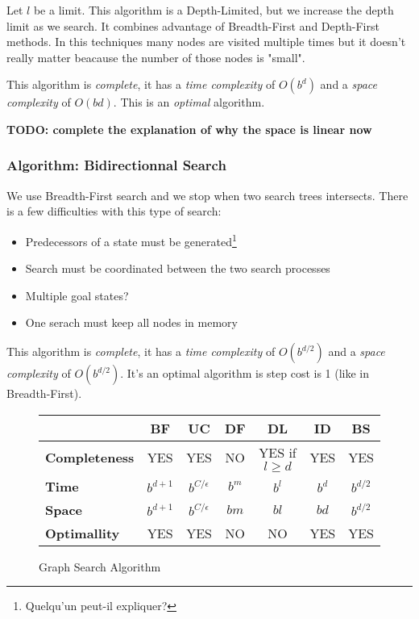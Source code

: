 Let $l$ be a limit. This algorithm is a Depth-Limited, but we increase the depth limit as we search. It combines advantage of Breadth-First and Depth-First methods. In this techniques many nodes are visited multiple times but it doesn't really matter beacause the number of those nodes is "small".

This algorithm is \textit{complete}, it has a \textit{time complexity} of $O(b^d)$ and a \textit{space complexity} of $O(bd)$. This is an \textit{optimal} algorithm.

\textbf{TODO: complete the explanation of why the space is linear now}

\subsubsection{Algorithm: Bidirectionnal Search}

We use Breadth-First search and we stop when two search trees intersects. There is a few difficulties with this type of search:
\begin{itemize}
\item Predecessors of a state must be generated\footnote{Quelqu'un peut-il expliquer?}
\item Search must be coordinated between the two search processes
\item Multiple goal states?
\item One serach must keep all nodes in memory
\end{itemize} 

This algorithm is \textit{complete}, it has a \textit{time complexity} of $O(b^{d/2})$ and a \textit{space complexity} of $O(b^{d/2})$. It's an optimal algorithm is step cost is 1 (like in Breadth-First). 

\begin{figure}[H]
\centering
\begin{tabular}{|l|cccccc|}
\hline
& \textbf{BF} & \textbf{UC} & \textbf{DF} & \textbf{DL} & \textbf{ID} & \textbf {BS}\\
\hline
\textbf{Completeness} & YES & YES & NO & YES if $l\geq d$ & YES & YES\\
\textbf{Time} & $b^{d+1}$ & $b^{C/\epsilon}$ & $b^m$ & $b^l$ & $b^d$ & $b^{d/2}$\\
\textbf{Space} & $b^{d+1}$ & $b^{C/\epsilon}$ & $bm$ & $bl$ & $bd$ & $b^{d/2}$ \\
\textbf{Optimallity} & YES & YES & NO & NO & YES & YES \\
\hline
\end{tabular}
\caption{Graph Search Algorithm}
\end{figure}

